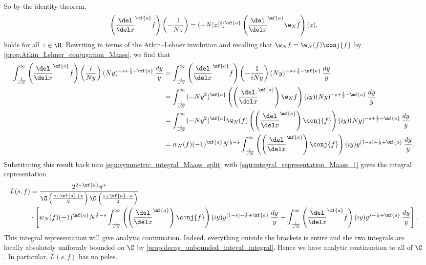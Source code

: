       So by the identity theorem,
      \[
        \left(\frac{\del}{\del x}^{\mf{a}}f\right)\left(-\frac{1}{Nz}\right) = (-N|z|^{2})^{\mf{a}}\left(\frac{\del}{\del x}^{\mf{a}}\w_{N}f\right)(z),
      \]
      holds for all $z \in \H$. Rewriting in terms of the Atkin–Lehner involution and recalling that $\w_{N}f = \w_{N}(f)\conj{f}$ by \cref{prop:Atkin_Lehner_conjugation_Maass}, we find that
      \begin{align*}
        \int_{\frac{1}{\sqrt{N}}}^{\infty}\left(\frac{\del}{\del x}^{\mf{a}}f\right)\left(\frac{i}{Ny}\right)(Ny)^{-s+\frac{1}{2}-\mf{a}}\,\frac{dy}{y} &= \int_{\frac{1}{\sqrt{N}}}^{\infty}\left(\frac{\del}{\del x}^{\mf{a}}f\right)\left(-\frac{1}{iNy}\right)(Ny)^{-s+\frac{1}{2}-\mf{a}}\,\frac{dy}{y} \\
        &= \int_{\frac{1}{\sqrt{N}}}^{\infty}(-Ny^{2})^{\mf{a}}\left(\left(\frac{\del}{\del x}^{\mf{a}}\right)\w_{N}f\right)(iy)(Ny)^{-s+\frac{1}{2}-\mf{a}}\,\frac{dy}{y} \\
        &= \int_{\frac{1}{\sqrt{N}}}^{\infty}(-Ny^{2})^{\mf{a}}\w_{N}(f)\left(\left(\frac{\del}{\del x}^{\mf{a}}\right)\conj{f}\right)(iy)(Ny)^{-s+\frac{1}{2}-\mf{a}}\,\frac{dy}{y} \\
        &= w_{N}(f)(-1)^{\mf{a}}N^{\frac{1}{2}-s}\int_{\frac{1}{\sqrt{N}}}^{\infty}\left(\left(\frac{\del}{\del x}^{\mf{a}}\right)\conj{f}\right)(iy)y^{(1-s)-\frac{1}{2}+\mf{a}}\,\frac{dy}{y}.
      \end{align*}
      Substituting this result back into \cref{equ:symmetric_integral_Maass_split} with \cref{equ:integral_representation_Maass_1} gives the integral representation
      \begin{align*}
        L(s,f) &= \frac{2^{2-\mf{a}}\pi^{s}}{\G\left(\frac{s+\mf{a}+\nu}{2}\right)\G\left(\frac{s+\mf{a}-\nu}{2}\right)} \\
        &\cdot \left[w_{N}(f)(-1)^{\mf{a}}N^{\frac{1}{2}-s}\int_{\frac{1}{\sqrt{N}}}^{\infty}\left(\left(\frac{\del}{\del x}^{\mf{a}}\right)\conj{f}\right)(iy)y^{(1-s)-\frac{1}{2}+\mf{a}}\,\frac{dy}{y}+\int_{\frac{1}{\sqrt{N}}}^{\infty}\left(\frac{\del}{\del x}^{\mf{a}}f\right)(iy)y^{s-\frac{1}{2}+\mf{a}}\,\frac{dy}{y}\right].
      \end{align*}
      This integral representation will give analytic continuation. Indeed, everything outside the brackets is entire and the two integrals are locally absolutely uniformly bounded on $\C$ by \cref{prop:decay_unbounded_inteval_integral}. Hence we have analytic continuation to all of $\C$. In particular, $L(s,f)$ has no poles.
